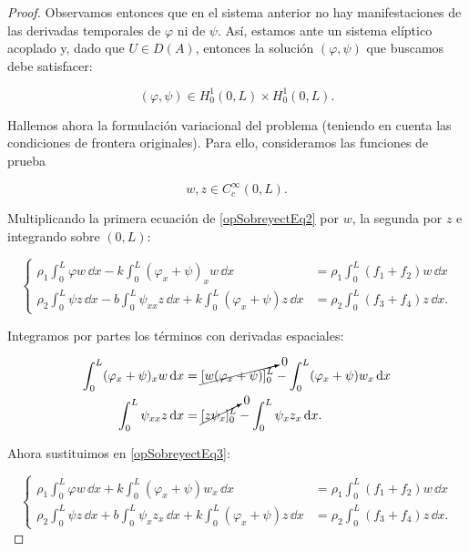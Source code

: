 \begin{proof}
    Observamos entonces que en el sistema anterior no hay manifestaciones de las derivadas temporales de $\varphi$ ni de $\psi$. Así, estamos ante un sistema elíptico acoplado y, dado que $U \in D(A)$, entonces la solución $(\varphi, \psi)$ que buscamos debe satisfacer:

    \[(\varphi, \psi) \in H_0^1(0,L) \times H_0^1(0,L).\]

    Hallemos ahora la formulación variacional del problema (teniendo en cuenta las condiciones de frontera originales). Para ello, consideramos las funciones de prueba

    \[w, z \in C_c^\infty(0,L).\]

    Multiplicando la primera ecuación de \eqref{opSobreyectEq2} por $w$, la segunda por $z$ e integrando sobre $(0,L)$:

    \begin{equation}
        \label{opSobreyectEq3}
        \begin{cases}
            \displaystyle \rho_1 \int_0^L \varphi w \, \dd x - k \int_0^L(\varphi_x + \psi)_x w \, \dd x &= \displaystyle\rho_1 \int_0^L (f_1 + f_2) w \, \dd x\\
            \displaystyle \rho_2\int_0^L \psi z \, \dd x - b \int_0^L \psi_{xx} z \, \dd x + k \int_0^L (\varphi_x + \psi) z \, \dd x &= \displaystyle\rho_2 \int_0^L (f_3 + f_4) z \, \dd x.
        \end{cases}
    \end{equation}

    Integramos por partes los términos con derivadas espaciales:

    \begin{align*}
        \int_0^L (\varphi_x + \psi)_x w \, \mathrm{d} x &= \cancelto{0}{[w(\varphi_x + \psi)]_0^L} - \int_0^L(\varphi_x + \psi) w_x \, \mathrm{d} x\\
        \int_0^L\psi_{xx}z \, \mathrm{d} x &= \cancelto{0}{[z \psi_x]_0^L} - \int_0^L \psi_x z_x \, \mathrm{d} x. 
    \end{align*}

    Ahora sustituimos en \eqref{opSobreyectEq3}:

    \begin{equation*}
        \begin{cases}
            \displaystyle \rho_1 \int_0^L \varphi w \, \dd x + k \int_0^L(\varphi_x + \psi) w_x \, \dd x &= \displaystyle\rho_1 \int_0^L (f_1 + f_2) w \, \dd x\\
            \displaystyle \rho_2\int_0^L \psi z \, \dd x + b \int_0^L \psi_{x} z_x \, \dd x + k \int_0^L (\varphi_x + \psi) z \, \dd x &= \displaystyle\rho_2 \int_0^L (f_3 + f_4) z \, \dd x.
        \end{cases}
    \end{equation*}


\end{proof}
